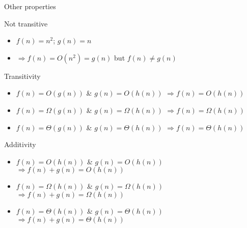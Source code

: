 \documentclass[english,10pt,table]{beamer}
\begin{document}
\begin{frame}{Other properties}
	
	\begin{block}{Not transitive}\footnotesize
	 \begin{itemize}
     \item $f(n) = n^2$; $g(n)= n$
		 \item $\Rightarrow f(n) = O(n^2) = g(n)$ but $f(n) \neq g(n)$
	\end{itemize}
 \end{block}
\pause
   \begin{block}{Transitivity}\small				
			\begin{itemize}\small				
		   \item $f(n) = O(g(n))$ \& $g(n) = O(h(n))$ $\Rightarrow f(n) = O(h(n))$
			 \item $f(n) = \Omega(g(n))$ \& $g(n) = \Omega(h(n))$ $\Rightarrow f(n) = \Omega(h(n))$
			 \item $f(n) = \Theta(g(n))$ \& $g(n) = \Theta(h(n))$ $\Rightarrow f(n) = \Theta(h(n))$
      \end{itemize}
   \end{block}
\pause
    \begin{block}{Additivity}\small				
			\begin{itemize}\small				
		   \item $f(n) = O(h(n))$ \& $g(n) = O(h(n))$ $\Rightarrow f(n) + g(n) = O(h(n))$
			 \item $f(n) = \Omega(h(n))$ \& $g(n) = \Omega(h(n))$ $\Rightarrow f(n) + g(n) = \Omega(h(n))$
			 \item $f(n) = \Theta(h(n))$ \& $g(n) = \Theta(h(n))$ $\Rightarrow f(n) + g(n) = \Theta(h(n))$
      \end{itemize}
   \end{block}
\end{frame}
\end{document}
